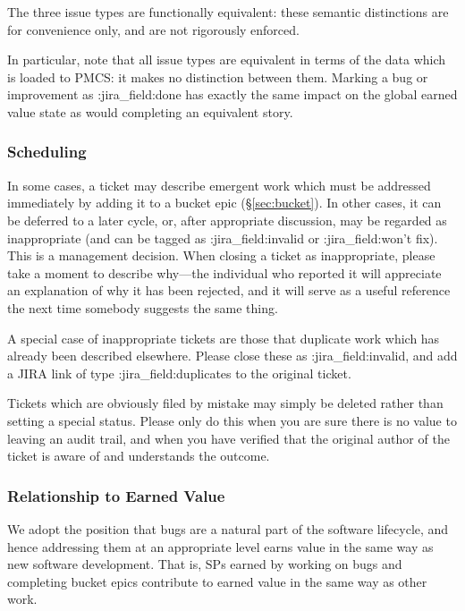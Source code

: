 The three issue types are functionally equivalent: these semantic
distinctions are for convenience only, and are not rigorously enforced.

In particular, note that all issue types are equivalent in terms of the
data which is loaded to PMCS: it makes no distinction between them.
Marking a bug or improvement as :jira\_field:done has exactly the same
impact on the global earned value state as would completing an
equivalent story.

\subsubsection{Scheduling}\label{scheduling}

In some cases, a ticket may describe emergent work which must be
addressed immediately by adding it to a
bucket epic (\S\ref{sec:bucket}). In other cases, it can
be deferred to a later cycle, or, after appropriate discussion, may be
regarded as inappropriate (and can be tagged as :jira\_field:invalid or
:jira\_field:won't fix). This is a management decision. When closing a
ticket as inappropriate, please take a moment to describe why---the
individual who reported it will appreciate an explanation of why it has
been rejected, and it will serve as a useful reference the next time
somebody suggests the same thing.

A special case of inappropriate tickets are those that duplicate work
which has already been described elsewhere. Please close these as
:jira\_field:invalid, and add a JIRA link of type
:jira\_field:duplicates to the original ticket.

Tickets which are obviously filed by mistake may simply be deleted
rather than setting a special status. Please only do this when you are
sure there is no value to leaving an audit trail, and when you have
verified that the original author of the ticket is aware of and
understands the outcome.

\subsubsection{Relationship to Earned
Value}\label{relationship-to-earned-value}

We adopt the position that bugs are a natural part of the software
lifecycle, and hence addressing them at an appropriate level earns value
in the same way as new software development. That is, SPs earned by
working on bugs and completing bucket epics contribute to earned value
in the same way as other work.

